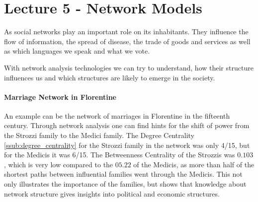 \section{Lecture 5 - Network Models} %
\label{sec:lecture_5_network_models}
As social networks play an important role on its inhabitants.
They influence the flow of information,
the spread of disease,
the trade of goods and services as well as which languages we speak and what we vote.

With network analysis technologies we can try to understand,
how their structure influences us
and which structures are likely to emerge in the society.

\paragraph{Marriage Network in Florentine} %
\label{par:marriage_network_in_florentine}
	An example can be the network of marriages in Florentine in the fifteenth century.
	Through network analysis one can find hints for the shift of power from the 
	Strozzi family to the Medici family.
	The Degree Centrality \ref{ssub:degree_centrality} for the Strozzi family in the network
	was only 4/15, but for the Medicis it was 6/15.
	The Betweenness Centrality of the Strozzis was $0.103$,
	which is very low compared to the $05.22$ of the Medicis,
	as more than half of the shortest paths between influential families went through the Medicis.
	This not only illustrates the importance of the families,
	but shows that knowledge about network structure gives insights into political and economic structures.

